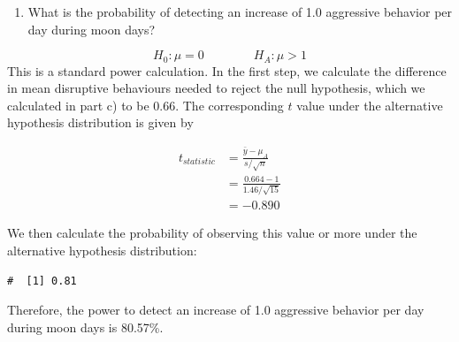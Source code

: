 \documentclass[letterpaper,11pt,twoside,]{pinp}
\providecommand{\tightlist}{%
  \setlength{\itemsep}{0pt}\setlength{\parskip}{0pt}}
\begin{document}
\begin{enumerate}
\def\labelenumi{\alph{enumi}.}
\setcounter{enumi}{3}
\tightlist
\item
  What is the probability of detecting an increase of 1.0 aggressive
  behavior per day during moon days?
\end{enumerate}

\[
H_0: \mu = 0 \qquad \qquad H_A: \mu > 1
\] This is a standard power calculation. In the first step, we calculate
the difference in mean disruptive behaviours needed to reject the null
hypothesis, which we calculated in part c) to be 0.66. The corresponding
\(t\) value under the alternative hypothesis distribution is given by

\begin{align*}
t_{statistic} & = \frac{\bar{y} - \mu_A}{s/\sqrt{n}} \\
 & = \frac{0.664 - 1}{1.46/\sqrt{15}} \\
 & = -0.890
\end{align*}

We then calculate the probability of observing this value or more under
the alternative hypothesis distribution:

\begin{Shaded}
\begin{Highlighting}[]
\NormalTok{(} \SpecialCharTok{{-}}\NormalTok{, }\SpecialCharTok{{-}} \NormalTok{, } \NormalTok{)}
\end{Highlighting}
\end{Shaded}

\begin{ShadedResult}
\begin{verbatim}
#  [1] 0.81
\end{verbatim}
\end{ShadedResult}

Therefore, the power to detect an increase of 1.0 aggressive behavior
per day during moon days is 80.57\%.





\end{document}
